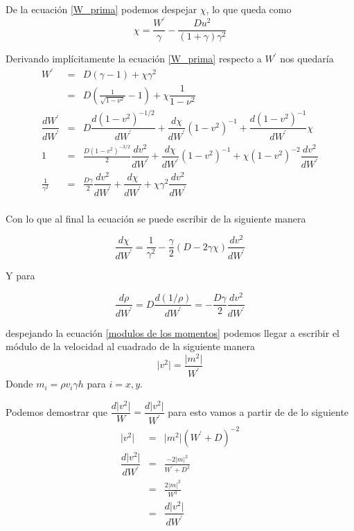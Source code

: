 \documentclass[12pt,a4paper]{book}
\providecommand{\abs}[1]{\lvert#1\rvert} %
\begin{document}
De la ecuación \ref{W_prima} podemos despejar $\chi$, lo que queda como
\begin{equation}
\chi=\frac{W^{'}}{\gamma}- \frac{D u^{2}}{(1+\gamma)\gamma^{2}}
\end{equation}

Derivando implícitamente la ecuación \ref{W_prima} respecto a $W^{'}$ nos quedaría
\begin{eqnarray*}
W^{'}&=&D\left(\gamma-1 \right) + \chi \gamma^{2}\\%
&=& D\left(\frac{1}{\sqrt{1-\nu^{2}}} -1\right)+\chi \dfrac{1}{1-\nu^{2}} \\%
\dfrac{d W^{'}}{d W^{'}} &=& D \dfrac{d (1-v^2)^{-1/2}}{d W^{'}}+\dfrac{d \chi}{dW^{'}}(1-v^2)^{-1}+\dfrac{d (1-v^2)^{-1} }{d W^{'}}\chi \\  %
1 &=& \frac{D(1-v^2)^{-3/2}}{2} \dfrac{d v^{2}}{d W^{'}}+\dfrac{d \chi}{dW^{'}}(1-v^2)^{-1}+ \chi (1-v^2)^{-2}  \dfrac{d v^{2}}{d W^{'}} \\ %
\frac{1}{\gamma ^2} &=& \frac{D \gamma}{2} \dfrac{d v^{2}}{d W^{'}} + \dfrac{d \chi}{dW^{'}} + \chi \gamma^2 \dfrac{d v^2}{dW^{'}} \\ %
\end{eqnarray*}

Con lo que al final la ecuación se puede escribir de la siguiente manera

\begin{equation}\label{der_chi}
\dfrac{d \chi}{dW^{'}}=\frac{1}{\gamma^2}-\frac{\gamma}{2}(D-2\gamma \chi) \dfrac{d v^2}{dW^{'}}
\end{equation}

Y para

\begin{equation}\label{der_rho}
\dfrac{d \rho}{d W^{'}}= D \dfrac{d\left(1/ \rho \right) }{d W^{'}} = - \frac{D \gamma}{2}  \dfrac{d v^2}{dW^{'}}
\end{equation}

despejando la ecuación \ref{modulos de los momentos} podemos llegar a escribir el módulo de la velocidad al cuadrado de la siguiente manera
\begin{equation}
\abs{v^{2}} = \frac{\abs{m^{2}}}{W^{'}} 
\end{equation}
Donde $m_i= \rho v_i \gamma h$ para $i=x,y$.

Podemos demostrar que $\dfrac{d \abs{v^2}}{W}=\dfrac{d \abs{v^2}}{W^{'}}$ para esto vamos a partir de de lo siguiente 
\begin{eqnarray*}
\abs{v^2}&=& \abs{m^{2}} \left(W^{'} + D \right)^{-2} \\
\dfrac{d \abs{v^2}}{d W^{'}} &=& \frac{-2 \abs{m}^2}{W^{'}+D^{3}} \\
&=& \frac{2 \abs{m}^2}{W^{3}} \\
&=& \dfrac{d \abs{v^2}}{d W^{'}}
\end{eqnarray*}
\end{document}
